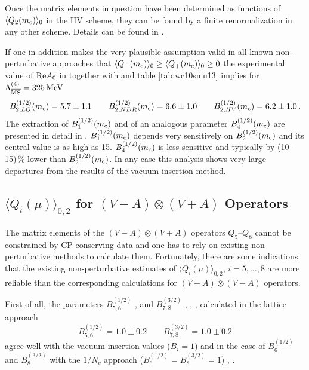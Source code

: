 Once the matrix elements in question have been determined as functions
of $\langle Q_2(m_{\rm c}) \rangle_0$ in the HV scheme, they can be found by a
finite renormalization in any other scheme. Details can be found in
\cite{burasetal:92d}.

If one in addition makes the very plausible assumption valid in all
known non-perturbative approaches that $\langle Q_-(m_{\rm c}) \rangle_0 \ge
\langle Q_+(m_{\rm c}) \rangle_0 \ge 0$ the experimental value of ${\rm Re}
A_0$ in  together with  and table
\ref{tab:wc10smu13} implies for $\Lambda_{\overline{\rm MS}}^{(4)}=325\, {\rm MeV}$
\begin{equation}
B_{2,LO}^{(1/2)}(m_{\rm c})  =  5.7 \pm 1.1
\qquad
B_{2,NDR}^{(1/2)}(m_{\rm c}) =  6.6 \pm 1.0
\qquad
B_{2,HV}^{(1/2)}(m_{\rm c}) =  6.2 \pm 1.0 \, .
\label{eq:B122mc}
\end{equation}
The extraction of $B_1^{(1/2)}(m_{\rm c})$ and of an analogous parameter
$B_4^{(1/2)}(m_{\rm c})$ are presented in detail in \cite{burasetal:92d}.
$B_1^{(1/2)}(m_{\rm c})$ depends very sensitively on $B_2^{(1/2)}(m_{\rm c})$ and
its central value is as high as 15. $B_4^{(1/2)}(m_{\rm c})$ is less sensitive
and typically by (10--15)\,\% lower than $B_2^{(1/2)}(m_{\rm c})$. In any case
this analysis shows very large departures from the results of the
vacuum insertion method.

\subsection{$\langle Q_i(\mu) \rangle_{0,2}$ for $(V-A)\otimes (V+A)$ Operators}
           \label{subsec:Qi0VmAVpA}
The matrix elements of the $(V-A) \otimes (V+A)$ operators $Q_5$--$Q_8$
cannot be constrained by CP conserving data and one has to rely on
existing non-perturbative methods to calculate them. Fortunately, there
are some indications that the existing non-perturbative estimates of
$\langle Q_i(\mu) \rangle_{0,2}$, $i=5,\ldots,8$ are more reliable than
the corresponding calculations for $(V-A) \otimes (V-A)$ operators.

First of all, the parameters $B_{5,6}^{(1/2)}$ \cite{kilcup:91},
\cite{sharpe:91} and $B_{7,8}^{(3/2)}$ \cite{francoetal:89},
\cite{kilcup:91}, \cite{sharpe:91}, \cite{bernardsoni:91} calculated in
the lattice approach
\begin{equation}
B_{5,6}^{(1/2)} = 1.0 \pm 0.2 
\qquad
B_{7,8}^{(3/2)} = 1.0 \pm 0.2 
\label{eq:B1258}
\end{equation}
agree well with the vacuum insertion values ($B_i=1$) and in the case
of $B_6^{(1/2)}$ and $B_8^{(3/2)}$ with the $1/N_c$ approach ($B_6^{(1/2)}
= B_8^{(3/2)} = 1$) \cite{bardeen:87a}, \cite{burasgerard:87}.

